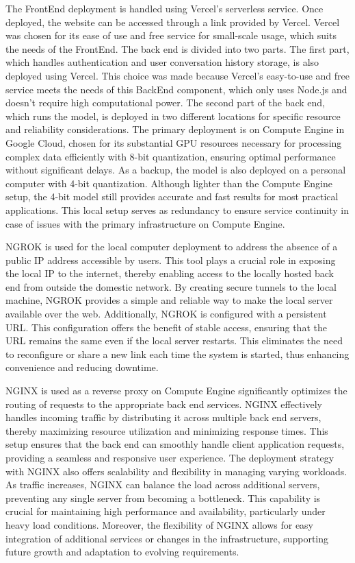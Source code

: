The FrontEnd deployment is handled using Vercel's serverless service. Once deployed, the website can be accessed through a link provided by Vercel. Vercel was chosen for its ease of use and free service for small-scale usage, which suits the needs of the FrontEnd. The back end is divided into two parts. The first part, which handles authentication and user conversation history storage, is also deployed using Vercel. This choice was made because Vercel's easy-to-use and free service meets the needs of this BackEnd component, which only uses Node.js and doesn't require high computational power. The second part of the back end, which runs the model, is deployed in two different locations for specific resource and reliability considerations. The primary deployment is on Compute Engine in Google Cloud, chosen for its substantial GPU resources necessary for processing complex data efficiently with 8-bit quantization, ensuring optimal performance without significant delays. As a backup, the model is also deployed on a personal computer with 4-bit quantization. Although lighter than the Compute Engine setup, the 4-bit model still provides accurate and fast results for most practical applications. This local setup serves as redundancy to ensure service continuity in case of issues with the primary infrastructure on Compute Engine.

NGROK is used for the local computer deployment to address the absence of a public IP address accessible by users. This tool plays a crucial role in exposing the local IP to the internet, thereby enabling access to the locally hosted back end from outside the domestic network. By creating secure tunnels to the local machine, NGROK provides a simple and reliable way to make the local server available over the web. Additionally, NGROK is configured with a persistent URL. This configuration offers the benefit of stable access, ensuring that the URL remains the same even if the local server restarts. This eliminates the need to reconfigure or share a new link each time the system is started, thus enhancing convenience and reducing downtime.

NGINX is used  as a reverse proxy on Compute Engine significantly optimizes the routing of requests to the appropriate back end services. NGINX effectively handles incoming traffic by distributing it across multiple back end servers, thereby maximizing resource utilization and minimizing response times. This setup ensures that the back end can smoothly handle client application requests, providing a seamless and responsive user experience. The deployment strategy with NGINX also offers scalability and flexibility in managing varying workloads. As traffic increases, NGINX can balance the load across additional servers, preventing any single server from becoming a bottleneck. This capability is crucial for maintaining high performance and availability, particularly under heavy load conditions. Moreover, the flexibility of NGINX allows for easy integration of additional services or changes in the infrastructure, supporting future growth and adaptation to evolving requirements.

